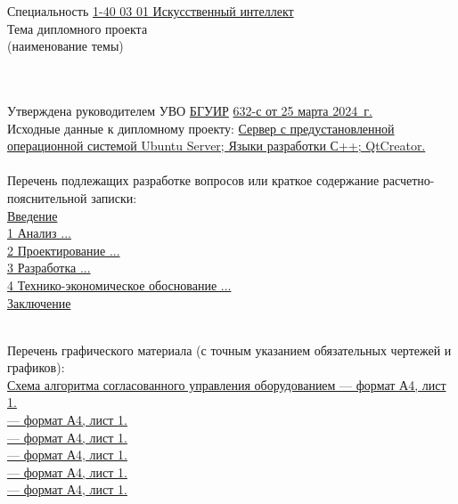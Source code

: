 {\begin{center}
  Специальность \uline{1-40 03 01 Искусственный интеллект}\lineunderscore\\[0.5em]

  Тема дипломного проекта \uline{\topicName}\lineunderscore \\
  {\footnotesize\hspace{15em}(наименование темы)}\\[-0.5em]
  \lineunderscore\\[0.5em]\lineunderscore\\
  \end{center}

  Утверждена руководителем УВО \uline{БГУИР} \textnumero  \uline{632-с от 25 марта 2024~г.}\lineunderscore\\[-0.5em]
  
  Исходные данные к дипломному проекту: \uline{Сервер с предустановленной операционной системой Ubuntu Server; Языки разработки С++; QtCreator.}\lineunderscore\\[0.5em]
  \lineunderscore\\
  
  Перечень подлежащих разработке вопросов или краткое содержание расчетно-пояснительной записки: 
  \lineunderscore\\
  \uline{Введение}\lineunderscore\\
  \uline{1 Анализ ...}\lineunderscore\\
  \uline{2 Проектирование ...}\lineunderscore\\
  \uline{3 Разработка ...}\lineunderscore\\
  \uline{4 Технико-экономическое обоснование ...}\lineunderscore\\
  \uline{Заключение}\lineunderscore\\
  \lineunderscore\\
  \clearpage
  \thispagestyle{empty}

  Перечень графического материала (с точным указанием обязательных чертежей и графиков):
  \lineunderscore\\
  \uline{Схема алгоритма согласованного управления оборудованием --- формат А4, лист 1. }\lineunderscore\\
  \uline{ --- формат А4, лист 1. }\lineunderscore\\
  \uline{ --- формат А4, лист 1. }\lineunderscore\\
  \uline{ --- формат А4, лист 1. }\lineunderscore\\
  \uline{ --- формат А4, лист 1. }\lineunderscore\\
  \uline{ --- формат А4, лист 1. }\lineunderscore\\
  \lineunderscore\\

}
